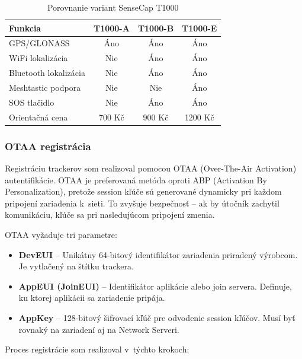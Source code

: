 \begin{table}[htbp]
    \centering
    \begin{tabular}{|l|c|c|c|}
        \hline
        \textbf{Funkcia} & \textbf{T1000-A} & \textbf{T1000-B} & \textbf{T1000-E} \\
        \hline
        GPS/GLONASS & Áno & Áno & Áno \\
        WiFi lokalizácia & Nie & Áno & Áno \\
        Bluetooth lokalizácia & Nie & Áno & Áno \\
        Meshtastic podpora & Nie & Nie & Áno \\
        SOS tlačidlo & Nie & Áno & Áno \\
        Orientačná cena & 700 Kč & 900 Kč & 1200 Kč \\
        \hline
    \end{tabular}
    \caption{Porovnanie variant SenseCap T1000}
    \label{tab:tracker-variants}
\end{table}

\subsubsection{OTAA registrácia}

Registráciu trackerov som realizoval pomocou OTAA (Over-The-Air Activation) autentifikácie. OTAA je preferovaná metóda oproti ABP (Activation By Personalization), pretože session kľúče sú generované dynamicky pri každom pripojení zariadenia k~sieti. To zvyšuje bezpečnosť -- ak by útočník zachytil komunikáciu, kľúče sa pri nasledujúcom pripojení zmenia.

OTAA vyžaduje tri parametre:

\begin{itemize}
    \item \textbf{DevEUI} -- Unikátny 64-bitový identifikátor zariadenia priradený výrobcom. Je vytlačený na štítku trackera.

    \item \textbf{AppEUI (JoinEUI)} -- Identifikátor aplikácie alebo join servera. Definuje, ku ktorej aplikácii sa zariadenie pripája.

    \item \textbf{AppKey} -- 128-bitový šifrovací kľúč pre odvodenie session kľúčov. Musí byť rovnaký na zariadení aj na Network Serveri.
\end{itemize}

Proces registrácie som realizoval v~týchto krokoch:

